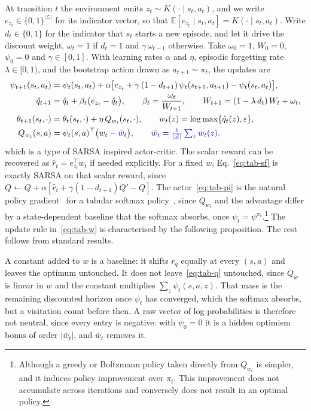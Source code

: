 \documentclass[11pt]{article}
\theoremstyle{remark}
\newcommand{\Zcal}{\mathcal Z}
\newcommand{\E}{\mathbb E}
\newcommand{\1}{\mathds{1}}
\newcommand{\new}[1]{\textcolor{blue!70!black}{#1}}
\begin{document}
At transition $t$ the environment emits $z_t\sim K(\cdot\mid s_t,a_t)$, and we write $e_{z_t}\in\{0,1\}^{|\Zcal|}$ for its indicator vector, so that $\E[e_{z_t}\mid s_t,a_t]=K(\cdot\mid s_t,a_t)$.
Write $d_t\in\{0,1\}$ for the indicator that $s_t$ starts a new episode, and let it drive the discount weight, $\omega_t=1$ if $d_t=1$ and $\gamma\,\omega_{t-1}$ otherwise.
Take $\omega_0=1$, $W_0=0$, $\psi_0=0$ and $\gamma\in[0,1]$.
With learning rates $\alpha$ and $\eta$, episodic forgetting rate $\lambda\in[0,1)$, and the bootstrap action drawn as $a_{t+1}\sim\pi_t$, the updates are
\begin{align}
  \psi_{t+1}(s_t,a_t) &= \psi_t(s_t,a_t)+\alpha\big[e_{z_t}+\gamma\,(1-d_{t+1})\,\psi_t(s_{t+1},a_{t+1})-\psi_t(s_t,a_t)\big],
  \label{eq:tab-sf}\\
  \hat q_{t+1} &= \hat q_t+\beta_t\big(e_{z_t}-\hat q_t\big),
  \qquad \beta_t=\frac{\omega_t}{W_{t+1}},
  \qquad W_{t+1}=(1-\lambda\,d_t)\,W_t+\omega_t,
  \label{eq:tab-w}\\
  \theta_{t+1}(s_t,\cdot) &= \theta_t(s_t,\cdot)+\eta\,Q_{w_t}(s_t,\cdot),
  \qquad w_t(z)=\log\max\{\hat q_t(z),\varepsilon\},
  \label{eq:tab-pi}\\
  Q_{w_t}(s,a) &= \psi_t(s,a)^\top\big(w_t\new{{}-\bar w_t}\big),
  \qquad \new{\bar w_t=\tfrac{1}{|\Zcal|}\textstyle\sum_{z}w_t(z)} .
  \label{eq:tab-q}
\end{align}
which is a type of SARSA inspired actor-critic.
The scalar reward can be recovered as $\hat r_t=e_{z_t}^\top w_t$ if needed explicitly.
For a fixed $w$, Eq.~\eqref{eq:tab-sf} is exactly SARSA on that scalar reward, since $Q\leftarrow Q+\alpha[\hat r_t+\gamma(1-d_{t+1})Q'-Q]$.
The actor~\eqref{eq:tab-pi} is the natural policy gradient~\citep{Kakade-natural01} for a tabular softmax policy~\citep[\S5.3]{Agarwal-theory21}, since $Q_{w_t}$ and the advantage differ by a state-dependent baseline that the softmax absorbs\new{, once $\psi_t=\psi^{\pi_t}$}.\footnote{Although a greedy or Boltzmann policy taken directly from $Q_{w_t}$ is simpler, and it induces policy improvement over $\pi_t$. This improvement does not accumulate across iterations and conversely does not result in an optimal policy.}
The update rule in~\eqref{eq:tab-w} is characterised by the following proposition.
The rest follows from standard results.

\new{A constant added to $w$ is a baseline: it shifts $r_q$ equally at every $(s,a)$ and leaves the optimum untouched.
It does not leave~\eqref{eq:tab-q} untouched, since $Q_w$ is linear in $w$ and the constant multiplies $\sum_z\psi_t(s,a,z)$.
That mass is the remaining discounted horizon once $\psi_t$ has converged, which the softmax absorbs, but a visitation count before then.
A raw vector of log-probabilities is therefore not neutral, since every entry is negative: with $\psi_0=0$ it is a hidden optimism bonus of order $|\bar w_t|$, and $\bar w_t$ removes it.}
\end{document}
